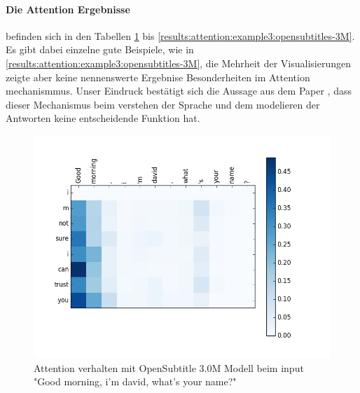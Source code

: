 \paragraph{Die Attention Ergebnisse} befinden sich in den Tabellen \ref{results:attention:example1:opensubtitles-3M} bis \ref{results:attention:example3:opensubtitles-3M}. Es gibt dabei einzelne gute Beispiele, wie in \ref{results:attention:example3:opensubtitles-3M}, die Mehrheit der Visualisierungen zeigte aber keine nennenswerte Ergebnise Besonderheiten im Attention mechanismmus. Unser Eindruck bestätigt sich die Aussage aus dem Paper \cite{Nguyen:2016}, dass dieser Mechanismus beim verstehen der Sprache und dem modelieren der Antworten keine entscheidende Funktion hat.
\begin{figure}[H]
	\centering
	\includegraphics[width=16cm]{img/attention/attention_visualization1_OpenSubtitle-3M.png}
	\caption{Attention verhalten mit OpenSubtitle 3.0M Modell beim input "Good morning, i'm david, what's your name?"}
	\label{results:attention:example1:opensubtitles-3M}
\end{figure}

